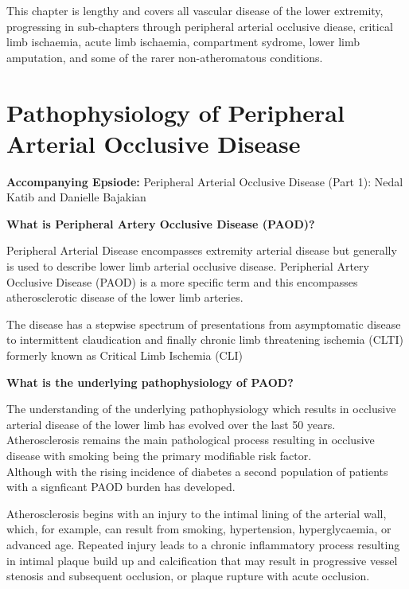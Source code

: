 \documentclass[
]{book}
\begin{document}
This chapter is lengthy and covers all vascular disease of the lower extremity,
progressing in sub-chapters through peripheral arterial occlusive diease, critical
limb ischaemia, acute limb ischaemia, compartment sydrome, lower limb amputation,
and some of the rarer non-atheromatous conditions.

\hypertarget{pathophysiology-of-peripheral-arterial-occlusive-disease}{%
\section{Pathophysiology of Peripheral Arterial Occlusive Disease}\label{pathophysiology-of-peripheral-arterial-occlusive-disease}}

\textbf{Accompanying Epsiode:}
Peripheral Arterial Occlusive Disease (Part 1): Nedal Katib and Danielle Bajakian

\textbf{What is Peripheral Artery Occlusive Disease (PAOD)?}

Peripheral Arterial Disease encompasses extremity arterial disease but
generally is used to describe lower limb arterial occlusive disease.
Peripherial Artery Occlusive Disease (PAOD) is a more specific term
and this encompasses atherosclerotic disease of the lower limb arteries.

The disease has a stepwise spectrum of presentations from asymptomatic
disease to intermittent claudication and finally chronic limb
threatening ischemia (CLTI) formerly known as Critical Limb Ischemia
(CLI) \citep{aboyans2017ESCGuidelines2018}

\textbf{What is the underlying pathophysiology of PAOD?}

The understanding of the underlying pathophysiology which results in
occlusive arterial disease of the lower limb has evolved over the
last 50 years. Atherosclerosis remains the main pathological process resulting
in occlusive disease with smoking being the primary modifiable risk factor.\\
Although with the rising incidence of diabetes a second population
of patients with a signficant PAOD burden has developed.

Atherosclerosis begins with an injury to the intimal lining
of the arterial wall, which, for example, can result from smoking,
hypertension, hyperglycaemia, or advanced age. Repeated injury
leads to a chronic inflammatory process resulting in intimal
plaque build up and calcification that may result in progressive
vessel stenosis and subsequent occlusion, or plaque rupture
with acute occlusion.
\end{document}
